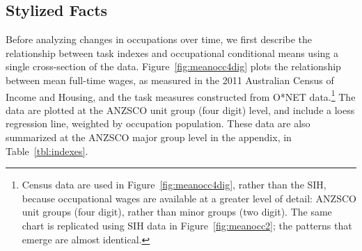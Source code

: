 \subsection{Stylized Facts}

Before analyzing changes in occupations over time, we first describe the relationship between task indexes and occupational conditional means using a single cross-section of the data. Figure~\ref{fig:meanocc4dig} plots the relationship between mean full-time wages, as measured in the 2011 Australian Census of Income and Housing, and the task measures constructed from O*NET data.\footnote{Census data are used in Figure~\ref{fig:meanocc4dig}, rather than the SIH, because occupational wages are available at a greater level of detail: ANZSCO unit groups (four digit), rather than minor groups (two digit). The same chart is replicated using SIH data in Figure~\ref{fig:meanocc2}; the patterns that emerge are almost identical.} The data are plotted at the ANZSCO unit group (four digit) level, and include a loess regression line, weighted by occupation population. These data are also summarized at the ANZSCO major group level in the appendix, in Table~\ref{tbl:indexes}.

